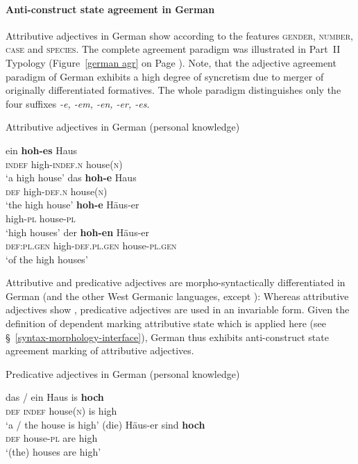 \paragraph*{Anti\hyp{}construct state agreement in German}
Attributive adjectives in German show  according to the features \textsc{gender, number, case} and \textsc{species}. The complete agreement paradigm was illustrated in Part~II Typology (Figure~\ref{german agr} on Page \pageref{german agr}). Note, that the adjective agreement paradigm of German exhibits a high degree of syncretism due to merger of originally differentiated formatives. The whole paradigm distinguishes only the four suffixes \textit{-e, -em, -en, -er, -es}.
\begin{exe}
\ex \rm{Attributive adjectives in German (personal knowledge)}
\begin{xlist}
\ex
\gll	ein \textbf{hoh-es} Haus\\
	\textsc{indef} high-\textsc{indef.n} house(\textsc{n})\\
\glt	‘a high house’
\ex	
\gll	das \textbf{hoh-e} Haus\\
	\textsc{def} high-\textsc{def.n} house(\textsc{n})\\
\glt	‘the high house’
\ex	
\gll	\textbf{hoh-e} Häus-er\\
	high-\textsc{pl} house-\textsc{pl}\\
\glt	‘high houses’
\ex	
\gll	der \textbf{hoh-en} Häus-er\\
	\textsc{def:pl.gen} high-\textsc{def.pl.gen} house-\textsc{pl.gen}\\
\glt	‘of the high houses’
\end{xlist}
\end{exe}
Attributive and predicative adjectives are morpho-syntactically differentiated in German (and the other West Germanic languages, except ): Whereas attributive adjectives show , predicative adjectives are used in an invariable form. Given the definition of dependent marking attributive state which is applied here (see \S~\ref{syntax-morphology-interface}), German thus exhibits anti\hyp{}construct state agreement marking of attributive adjectives.
\begin{exe}
\ex \rm{Predicative adjectives in German (personal knowledge)}
\begin{xlist}
\ex
\gll	das / ein Haus is \textbf{hoch}\\
	\textsc{def} {} \textsc{indef} house(\textsc{n}) is high\\
\glt	‘a / the house is high’
\ex	
\gll	(die) Häus-er sind \textbf{hoch}\\
	\textsc{def} house-\textsc{pl} are high\\
\glt	‘(the) houses are high’
\end{xlist}
\end{exe}

